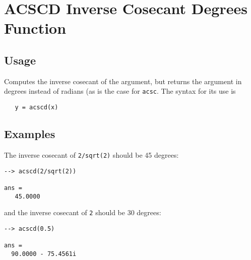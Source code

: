 \section{ACSCD Inverse Cosecant Degrees Function}

\subsection{Usage}

Computes the inverse cosecant of the argument, but returns
the argument in degrees instead of radians (as is the case
for \verb|acsc|. The syntax for its use is
\begin{verbatim}
   y = acscd(x)
\end{verbatim}
\subsection{Examples}

The inverse cosecant of \verb|2/sqrt(2)| should be 45 degrees:
\begin{verbatim}
--> acscd(2/sqrt(2))

ans = 
   45.0000 
\end{verbatim}
and the inverse cosecant of \verb|2| should be 30 degrees:
\begin{verbatim}
--> acscd(0.5)

ans = 
  90.0000 - 75.4561i 
\end{verbatim}
